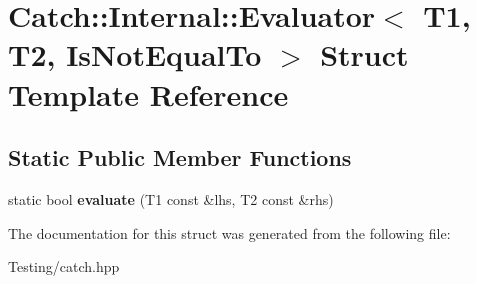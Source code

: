 \hypertarget{struct_catch_1_1_internal_1_1_evaluator_3_01_t1_00_01_t2_00_01_is_not_equal_to_01_4}{\section{Catch\-:\-:Internal\-:\-:Evaluator$<$ T1, T2, Is\-Not\-Equal\-To $>$ Struct Template Reference}
\label{struct_catch_1_1_internal_1_1_evaluator_3_01_t1_00_01_t2_00_01_is_not_equal_to_01_4}
}
\subsection*{Static Public Member Functions}
\begin{DoxyCompactItemize}
\item 
\hypertarget{struct_catch_1_1_internal_1_1_evaluator_3_01_t1_00_01_t2_00_01_is_not_equal_to_01_4_a956a12d0f4a7dceb5a1ce914421ff945}{static bool {\bfseries evaluate} (T1 const \&lhs, T2 const \&rhs)}\label{struct_catch_1_1_internal_1_1_evaluator_3_01_t1_00_01_t2_00_01_is_not_equal_to_01_4_a956a12d0f4a7dceb5a1ce914421ff945}

\end{DoxyCompactItemize}


The documentation for this struct was generated from the following file\-:\begin{DoxyCompactItemize}
\item 
Testing/catch.\-hpp\end{DoxyCompactItemize}
